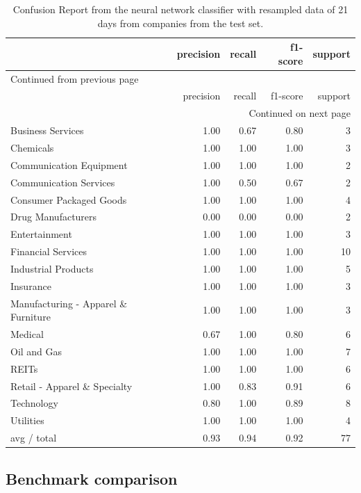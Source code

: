 \documentclass[a4paper,twoside]{article}
\begin{document}
\begin{longtable}{|l|rrrr|}
\caption{\label{tab:org57ac37e}
Confusion Report from the neural network classifier with resampled data of 21 days from companies from the test set.}
\\
\hline
 & precision & recall & f1-score & support\\
\hline
\endfirsthead
\multicolumn{5}{l}{Continued from previous page} \\
\hline

 & precision & recall & f1-score & support \\

\hline
\endhead
\hline\multicolumn{5}{r}{Continued on next page} \\
\endfoot
\endlastfoot
\hline
Business Services & 1.00 & 0.67 & 0.80 & 3\\
Chemicals & 1.00 & 1.00 & 1.00 & 3\\
Communication Equipment & 1.00 & 1.00 & 1.00 & 2\\
Communication Services & 1.00 & 0.50 & 0.67 & 2\\
Consumer Packaged Goods & 1.00 & 1.00 & 1.00 & 4\\
Drug Manufacturers & 0.00 & 0.00 & 0.00 & 2\\
Entertainment & 1.00 & 1.00 & 1.00 & 3\\
Financial Services & 1.00 & 1.00 & 1.00 & 10\\
Industrial Products & 1.00 & 1.00 & 1.00 & 5\\
Insurance & 1.00 & 1.00 & 1.00 & 3\\
Manufacturing - Apparel \& Furniture & 1.00 & 1.00 & 1.00 & 3\\
Medical & 0.67 & 1.00 & 0.80 & 6\\
Oil and Gas & 1.00 & 1.00 & 1.00 & 7\\
REITs & 1.00 & 1.00 & 1.00 & 6\\
Retail - Apparel \& Specialty & 1.00 & 0.83 & 0.91 & 6\\
Technology & 0.80 & 1.00 & 0.89 & 8\\
Utilities & 1.00 & 1.00 & 1.00 & 4\\
\hline
avg / total & 0.93 & 0.94 & 0.92 & 77\\
\hline
\end{longtable}


\subsection{Benchmark comparison}
\label{sec:org45ebadd}
\end{document}
